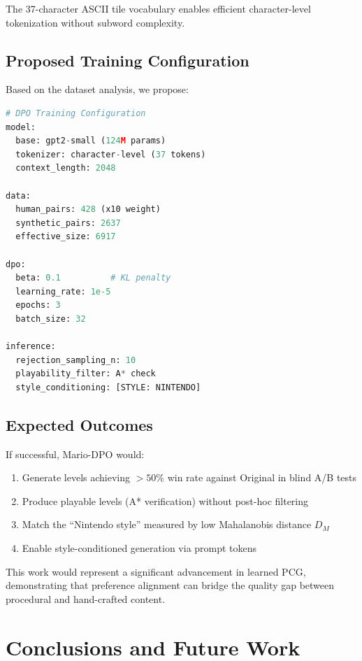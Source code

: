 \documentclass[11pt,a4paper]{article}
\theoremstyle{plain}
\theoremstyle{definition}
\theoremstyle{remark}
\begin{document}
The 37-character ASCII tile vocabulary enables efficient character-level tokenization without subword complexity.

\subsection{Proposed Training Configuration}
\label{subsec:training-config}

Based on the dataset analysis, we propose:

\begin{lstlisting}[language=Python,caption=Mario-DPO Training Configuration]
# DPO Training Configuration
model:
  base: gpt2-small (124M params)
  tokenizer: character-level (37 tokens)
  context_length: 2048

data:
  human_pairs: 428 (x10 weight)
  synthetic_pairs: 2637
  effective_size: 6917

dpo:
  beta: 0.1          # KL penalty
  learning_rate: 1e-5
  epochs: 3
  batch_size: 32

inference:
  rejection_sampling_n: 10
  playability_filter: A* check
  style_conditioning: [STYLE: NINTENDO]
\end{lstlisting}

\subsection{Expected Outcomes}
\label{subsec:expected-outcomes}

If successful, Mario-DPO would:
\begin{enumerate}
    \item Generate levels achieving $>50\%$ win rate against Original in blind A/B tests
    \item Produce playable levels (A* verification) without post-hoc filtering
    \item Match the ``Nintendo style'' measured by low Mahalanobis distance $D_M$
    \item Enable style-conditioned generation via prompt tokens
\end{enumerate}

This work would represent a significant advancement in learned PCG, demonstrating that preference alignment can bridge the quality gap between procedural and hand-crafted content.

\section{Conclusions and Future Work}
\label{sec:conclusions}
\end{document}
